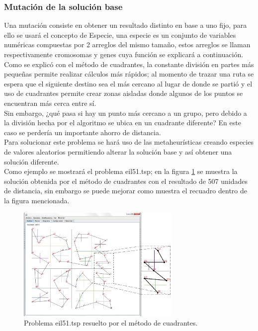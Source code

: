 \subsubsection{Mutación de la solución base}
Una mutación consiste en obtener un resultado distinto en base a uno fijo, para ello se usará el concepto de Especie, una especie es un conjunto de variables numéricas compuestas por 2 arreglos del mismo tamaño, estos arreglos se llaman respectivamente cromosomas y genes cuya función se explicará a continuación.\\
\hspace*{1cm}Como se explicó con el método de cuadrantes, la constante división en partes más pequeñas permite realizar cálculos más rápidos; al momento de trazar una ruta se espera que el siguiente destino sea el más cercano al lugar de donde se partió y el uso de cuadrantes permite crear zonas aisladas donde algunos de los puntos se encuentran más cerca entre sí.\\
\hspace*{1cm}Sin embargo, ¿qué pasa si hay un punto más cercano a un grupo, pero debido a la división hecha por el algoritmo se ubica en un cuadrante diferente? En este caso se perdería un importante ahorro de distancia.\\
\hspace*{1cm}Para solucionar este problema se hará uso de las metaheurísticas creando especies de valores aleatorios permitiendo alterar la solución base y así obtener una solución diferente.\\
\hspace*{1cm}Como ejemplo se mostrará el problema eil51.tsp; en la figura \ref {fig:eil51_original.png} se muestra la solución obtenida por el método de cuadrantes con el resultado de 507 unidades de distancia, sin embargo se puede mejorar como muestra el recuadro dentro de la figura mencionada.

     \begin{figure}[hbtp]
        \centering
            \includegraphics[width=0.7\textwidth]{PruebasResultados/Imagenes/eil51_original_recuadro.png}
            \caption{Problema eil51.tsp resuelto por el método de cuadrantes.}
            \label{fig:eil51_original.png}
    \end{figure}
    

